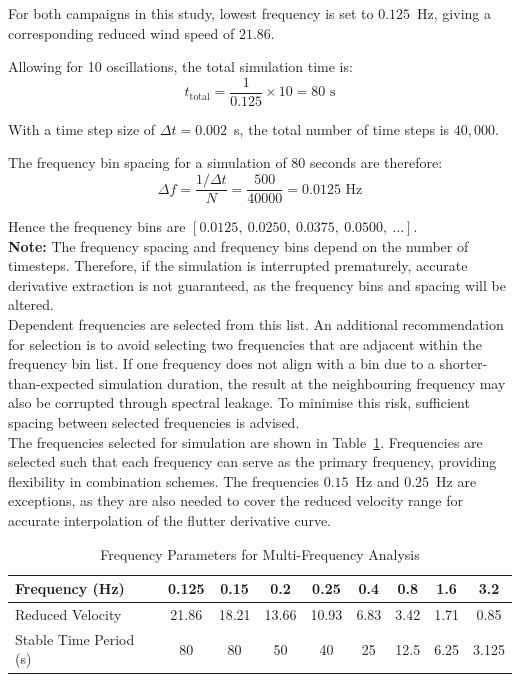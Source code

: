 \documentclass[a4paper, 12pt]{report}
\begin{document}
For both campaigns in this study, lowest frequency is set to $0.125$~Hz, 
giving a corresponding reduced wind speed of $21.86$.

Allowing for 10 oscillations, the total simulation time is:
\begin{equation}
    t_{\text{total}} = \frac{1}{0.125} \times 10 = 80 \text{ s}
\end{equation}

With a time step size of $\Delta t = 0.002$~s, the total number of time steps is $40{,}000$.

The frequency bin spacing for a simulation of 80 seconds are therefore:
\begin{equation}
    \Delta f = \frac{1/\Delta t}{N} = \frac{500}{40000} = 0.0125 \text{ Hz}
\end{equation}

Hence the frequency bins are $[0.0125,\ 0.0250,\ 0.0375,\ 0.0500,\ \ldots]$. \\

\textbf{Note:} The frequency spacing and frequency bins depend on the number of timesteps. Therefore, if the simulation 
is interrupted prematurely, accurate derivative extraction is not guaranteed, as the frequency bins and 
spacing will be altered. \\

Dependent frequencies are selected from this list. An additional recommendation for selection is to avoid selecting 
two frequencies that are adjacent within the frequency bin list. If one frequency does not 
align with a bin due to a shorter-than-expected simulation duration, the result at the 
neighbouring frequency may also be corrupted through spectral leakage. To minimise this risk, 
sufficient spacing between selected frequencies is advised. \\

The frequencies selected for simulation are shown in Table~\ref{tab:frequencies}. 
Frequencies are selected such that each frequency can serve as the primary frequency, 
providing flexibility in combination schemes. The frequencies $0.15$~Hz and $0.25$~Hz are exceptions, 
as they are also needed to cover the reduced velocity range for accurate interpolation of the 
flutter derivative curve.

\begin{table}[htbp]
\centering
\caption{Frequency Parameters for Multi-Frequency Analysis}
\label{tab:frequencies}
\begin{tabular}{@{}lcccccccc@{}}
\toprule
\textbf{Frequency (Hz)} & 0.125 & 0.15 & 0.2 & 0.25 & 0.4 & 0.8 & 1.6 & 3.2 \\
\midrule
Reduced Velocity        & 21.86 & 18.21 & 13.66 & 10.93 & 6.83 & 3.42 & 1.71 & 0.85 \\
Stable Time Period (s)  & 80    & 80    & 50    & 40    & 25   & 12.5 & 6.25 & 3.125 \\
\bottomrule
\end{tabular}
\end{table}
\end{document}

